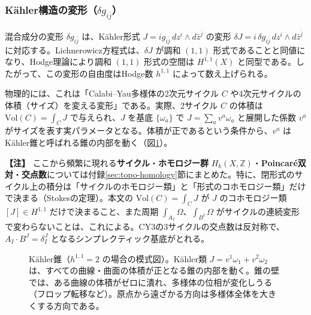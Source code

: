 \documentclass[uplatex, dvipdfmx, book]{jsbook}
\let\origsubsubsection\subsubsection
\renewcommand{\subsection}{\origsubsubsection}
\renewcommand{\subsubsection}{\paragraph}
\newenvironment{note}{\vspace{1ex}\par\footnotesize\noindent\textbf{【注】}}{\par\vspace{1ex}}
\begin{document}
\subsection{K\"ahler構造の変形（$\delta g_{i\bar{j}}$）}

混合成分の変形 $\delta g_{i\bar{j}}$ は、K\"ahler形式 $J = i g_{i\bar{j}}\, dz^i \wedge d\bar{z}^{\bar{j}}$ の変形 $\delta J = i\,\delta g_{i\bar j}\, dz^i \wedge d\bar z^{\bar j}$ に対応する。Lichnerowicz方程式は、$\delta J$ が調和 $(1,1)$ 形式であることと同値になり、Hodge理論により調和 $(1,1)$ 形式の空間は $H^{1,1}(X)$ と同型である。したがって、この変形の自由度はHodge数 $h^{1,1}$ によって数え上げられる。

物理的には、これは「Calabi--Yau多様体の2次元サイクル $C$ や4次元サイクルの体積（サイズ）を変える変形」である。実際、2サイクル $C$ の体積は $\mathrm{Vol}(C) = \int_C J$ で与えられ、$J$ を基底 $\{\omega_a\}$ で $J = \sum_a v^a \omega_a$ と展開した係数 $v^a$ がサイズを表す実パラメータとなる。体積が正であるという条件から、$v^a$ はK\"ahler錐と呼ばれる錐の内部を動く（図\ref{fig:kahler-cone}）。

\begin{note}
ここから頻繁に現れる\textbf{サイクル}・\textbf{ホモロジー群} $H_k(X, \mathbb{Z})$・\textbf{Poincar\'e双対}・\textbf{交点数}については付録\ref{sec:topo-homology}節にまとめた。特に、閉形式のサイクル上の積分は「サイクルのホモロジー類」と「形式のコホモロジー類」だけで決まる（Stokesの定理）。本文の $\mathrm{Vol}(C) = \int_C J$ が $J$ のコホモロジー類 $[J] \in H^{1,1}$ だけで決まること、また周期 $\int_{A_I}\Omega$、$\int_{B^I}\Omega$ がサイクルの連続変形で変わらないことは、これによる。CY3の3サイクルの交点数は反対称で、$A_I \cdot B^J = \delta_I^J$ となるシンプレクティック基底がとれる。
\end{note}

\begin{figure}[htbp]
\centering
{}
\caption{K\"ahler錐（$h^{1,1} = 2$ の場合の模式図）。K\"ahler類 $J = v^1\omega_1 + v^2\omega_2$ は、すべての曲線・曲面の体積が正となる錐の内部を動く。錐の壁では、ある曲線の体積がゼロに潰れ、多様体の位相が変化しうる（フロップ転移など）。原点から遠ざかる方向は多様体全体を大きくする方向である。}
\label{fig:kahler-cone}
\end{figure}
\end{document}
